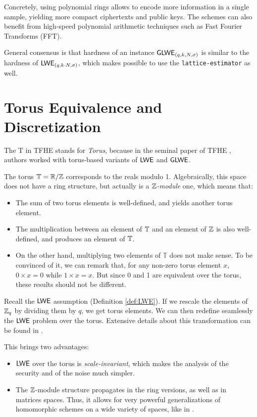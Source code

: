 Concretely, using polynomial rings allows to encode more information in a single sample, yielding more compact ciphertexts and public keys. The schemes can also benefit from high-speed polynomial arithmetic techniques such as Fast Fourier Transforms (FFT). 

General consensus is that hardness of an instance $\textsf{GLWE}_{(q, k, N, \sigma)}$ is similar to the hardness of $\textsf{LWE}_{(q, k \cdot N, \sigma)}$, which makes possible to use the \texttt{lattice-estimator} as well.


\section{Torus Equivalence and Discretization}
\label{sec:torus_equivalence}


The T in TFHE stands for \textit{Torus}, because in the seminal paper of TFHE \cite{JC:CGGI20}, authors worked with torus-based variants of $\textsf{LWE}$ and $\textsf{GLWE}$.


The torus $\mathbb{T} = \mathbb{R} / \mathbb{Z}$ corresponds to the reals modulo 1. Algebraically, this space does not have a ring structure, but actually is a \textit{$\mathbb{Z}$-module} one, which means that:

\begin{itemize}
	\item The sum of two torus elements is well-defined, and yields another torus element.
	\item The multiplication between an element of $\mathbb{T}$ and an element of $\mathbb{Z}$ is also well-defined, and produces an element of $\mathbb{T}$.
	\item On the other hand, multiplying two elements of $\mathbb T$ does not make sense. To be convinced of it, we can remark that, for any non-zero torus element $x$, $0 \times x = 0$ while $1 \times x = x$. But since 0 and 1 are equivalent over the torus, these results should not be different. 
\end{itemize}



Recall the $\textsf{LWE}$ assumption (Definition \ref{def:LWE}). If we rescale the elements of $\mathbb{Z}_q$ by dividing them by $q$, we get torus elements. We can then redefine seamlessly the $\textsf{LWE}$ problem over the torus. Extensive details about this transformation can be found in \cite{these_chillotti}.


This brings two advantages:

\begin{itemize}
	\item $\textsf{LWE}$ over the torus is \textit{scale-invariant}, which makes the analysis of the security and of the noise much simpler.
	\item The $\mathbb{Z}$-module structure propagates in the ring versions, as well as in matrices spaces. Thus, it allows for very powerful generalizations of homomorphic schemes on a wide variety of spaces, like in \cite{chimera, chimera2}.
\end{itemize} 


